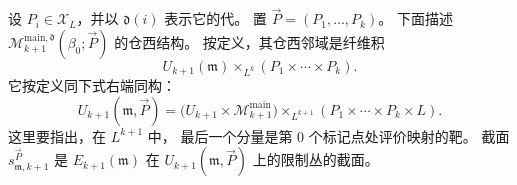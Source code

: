 设 $P_i\in\mathcal X_L$，并以 $\mathfrak d(i)$ 表示它的代。
置 $\vec P=(P_1,\ldots,P_k)$。
下面描述
$\mathcal M_{k+1}^{\mathrm{main},\mathfrak d}
(\beta_0;\vec P)$ 的仓西结构。
按定义，其仓西邻域是纤维积
\[
U_{k+1}(\mathfrak m)
\mathbin{\times_{L^k}}(P_1\times\cdots\times P_k).
\]
它按定义同下式右端同构：
\begin{equation}
U_{k+1}(\mathfrak m,\vec P)
=\bigl(U_{k+1}\times\mathcal M_{k+1}^{\mathrm{main}}\bigr)
\mathbin{\times_{L^{k+1}}}
(P_1\times\cdots\times P_k\times L).
\tag{7.5.12}\label{eq:7-5-12}
\end{equation}
这里要指出，在 $L^{k+1}$ 中，
最后一个分量是第 $0$ 个标记点处评价映射的靶。
截面 $s_{\mathfrak m,k+1}^{\vec P}$ 是
$E_{k+1}(\mathfrak m)$ 在
$U_{k+1}(\mathfrak m,\vec P)$ 上的限制丛的截面。
